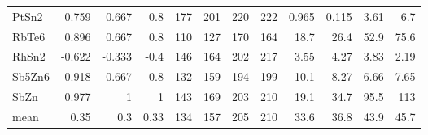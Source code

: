 \begin{tabular}{lrrrrrrrrrrr}
PtSn2      &       0.759 &   0.667 &      0.8 &  177 & 201 & 220 &  222 & 0.965 & 0.115 &  3.61 &    6.7 \\
RbTe6      &       0.896 &   0.667 &      0.8 &  110 & 127 & 170 &  164 &  18.7 &  26.4 &  52.9 &   75.6 \\
RhSn2      &      -0.622 &  -0.333 &     -0.4 &  146 & 164 & 202 &  217 &  3.55 &  4.27 &  3.83 &   2.19 \\
Sb5Zn6     &      -0.918 &  -0.667 &     -0.8 &  132 & 159 & 194 &  199 &  10.1 &  8.27 &  6.66 &   7.65 \\
SbZn       &       0.977 &       1 &        1 &  143 & 169 & 203 &  210 &  19.1 &  34.7 &  95.5 &    113 \\
mean       &        0.35 &     0.3 &     0.33 &  134 & 157 & 205 &  210 &  33.6 &  36.8 &  43.9 &   45.7 \\
\bottomrule
\end{tabular}
